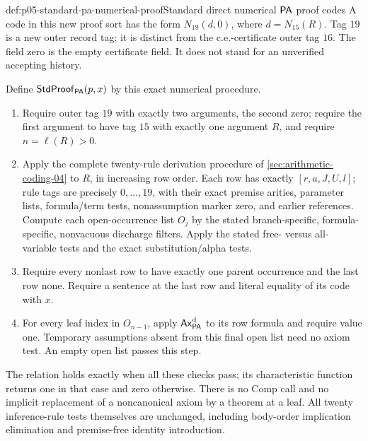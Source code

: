 \begin{hbdefinition}{def:p05-standard-pa-numerical-proof}{Standard direct numerical \(\mathsf{PA}\) proof codes}
A code in this new proof sort has the form \(N_{19}(d,0)\), where
\(d=N_{15}(R)\).  Tag \(19\) is a new outer record tag; it is distinct
from the c.e.-certificate outer tag \(16\).  The field zero is the empty
certificate field.  It does not stand for an unverified accepting history.

Define \(\mathsf{StdProof}_{\mathsf{PA}}(p,x)\) by this exact numerical procedure.
\begin{enumerate}
\item Require outer tag \(19\) with exactly two arguments, the second zero;
      require the first argument to have tag \(15\) with exactly one argument
      \(R\), and require \(n=\ell(R)>0\).
\item Apply the complete twenty-rule derivation procedure of
      \cref{sec:arithmetic-coding-04} to \(R\), in increasing row order.
      Each row has exactly \([r,a,J,U,l]\); rule tags are precisely
      \(0,\ldots,19\), with their exact premise arities, parameter lists,
      formula/term tests, nonassumption marker zero, and earlier references.
      Compute each open-occurrence list \(O_j\) by the stated branch-specific,
      formula-specific, nonvacuous discharge filters.  Apply the stated free-
      versus all-variable tests and the exact substitution/alpha tests.
\item Require every nonlast row to have exactly one parent occurrence and
      the last row none.  Require a sentence at the last row and literal
      equality of its code with \(x\).
\item For every leaf index in \(O_{n-1}\), apply
      \(\mathsf{Ax}^{\rm d}_{\mathsf{PA}}\) to its row formula and require value one.
      Temporary assumptions absent from this final open list need no axiom
      test.  An empty open list passes this step.
\end{enumerate}
The relation holds exactly when all these checks pass; its characteristic
function returns one in that case and zero otherwise.
There is no Comp call and no implicit replacement of a noncanonical axiom
by a theorem at a leaf.  All twenty inference-rule tests themselves are
unchanged, including body-order implication elimination and premise-free
identity introduction.
\end{hbdefinition}

